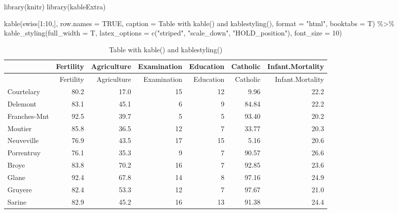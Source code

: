 \documentclass[
  letterpaper,
  DIV=11,
  numbers=noendperiod]{scrartcl}
\newenvironment{Shaded}{\begin{snugshade}}{\end{snugshade}}
\newcommand{\AttributeTok}[1]{\textcolor[rgb]{0.40,0.45,0.13}{#1}}
\newcommand{\ConstantTok}[1]{\textcolor[rgb]{0.56,0.35,0.01}{#1}}
\newcommand{\DecValTok}[1]{\textcolor[rgb]{0.68,0.00,0.00}{#1}}
\newcommand{\FunctionTok}[1]{\textcolor[rgb]{0.28,0.35,0.67}{#1}}
\newcommand{\NormalTok}[1]{\textcolor[rgb]{0.00,0.23,0.31}{#1}}
\newcommand{\SpecialCharTok}[1]{\textcolor[rgb]{0.37,0.37,0.37}{#1}}
\newcommand{\StringTok}[1]{\textcolor[rgb]{0.13,0.47,0.30}{#1}}
\begin{document}
\begin{Shaded}
\begin{Highlighting}[]
\FunctionTok{library}\NormalTok{(knitr)}
\FunctionTok{library}\NormalTok{(kableExtra)}

\FunctionTok{kable}\NormalTok{(swiss[}\DecValTok{1}\SpecialCharTok{:}\DecValTok{10}\NormalTok{,], }\AttributeTok{row.names =} \ConstantTok{TRUE}\NormalTok{, }
      \AttributeTok{caption =} \StringTok{\textquotesingle{}Table with kable() and kablestyling()\textquotesingle{}}\NormalTok{, }
      \AttributeTok{format =} \StringTok{"html"}\NormalTok{, }\AttributeTok{booktabs =}\NormalTok{ T) }\SpecialCharTok{\%\textgreater{}\%}
        \FunctionTok{kable\_styling}\NormalTok{(}\AttributeTok{full\_width =}\NormalTok{ T, }
                      \AttributeTok{latex\_options =} \FunctionTok{c}\NormalTok{(}\StringTok{"striped"}\NormalTok{, }
                                        \StringTok{"scale\_down"}\NormalTok{,}
                                        \StringTok{"HOLD\_position"}\NormalTok{),}
                      \AttributeTok{font\_size =} \DecValTok{10}\NormalTok{)}
\end{Highlighting}
\end{Shaded}

\begin{longtable}[]{@{}lrrrrrr@{}}
\caption{Table with kable() and kablestyling()}\tabularnewline
\toprule()
& Fertility & Agriculture & Examination & Education & Catholic &
Infant.Mortality \\
\midrule()
\endfirsthead
\toprule()
& Fertility & Agriculture & Examination & Education & Catholic &
Infant.Mortality \\
\midrule()
\endhead
Courtelary & 80.2 & 17.0 & 15 & 12 & 9.96 & 22.2 \\
Delemont & 83.1 & 45.1 & 6 & 9 & 84.84 & 22.2 \\
Franches-Mnt & 92.5 & 39.7 & 5 & 5 & 93.40 & 20.2 \\
Moutier & 85.8 & 36.5 & 12 & 7 & 33.77 & 20.3 \\
Neuveville & 76.9 & 43.5 & 17 & 15 & 5.16 & 20.6 \\
Porrentruy & 76.1 & 35.3 & 9 & 7 & 90.57 & 26.6 \\
Broye & 83.8 & 70.2 & 16 & 7 & 92.85 & 23.6 \\
Glane & 92.4 & 67.8 & 14 & 8 & 97.16 & 24.9 \\
Gruyere & 82.4 & 53.3 & 12 & 7 & 97.67 & 21.0 \\
Sarine & 82.9 & 45.2 & 16 & 13 & 91.38 & 24.4 \\
\bottomrule()
\end{longtable}
\end{document}
